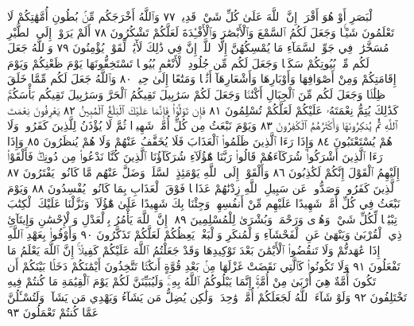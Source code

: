 ٱلْبَصَرِ أَوْ هُوَ أَقْرَبُۚ إِنَّ ٱللَّهَ عَلَىٰ كُلِّ شَيْءࣲ قَدِيرࣱ ٧٧
وَٱللَّهُ أَخْرَجَكُم مِّنۢ بُطُونِ أُمَّهَٰتِكُمْ لَا تَعْلَمُونَ شَيْـࣰٔا
وَجَعَلَ لَكُمُ ٱلسَّمْعَ وَٱلْأَبْصَٰرَ وَٱلْأَفْـِٔدَةَ لَعَلَّكُمْ
تَشْكُرُونَ ٧٨ أَلَمْ يَرَوْا۟ إِلَى ٱلطَّيْرِ مُسَخَّرَٰتࣲ فِي جَوِّ ٱلسَّمَآءِ
مَا يُمْسِكُهُنَّ إِلَّا ٱللَّهُۚ إِنَّ فِي ذَٰلِكَ لَأٓيَٰتࣲ لِّقَوْمࣲ يُؤْمِنُونَ ٧٩
وَٱللَّهُ جَعَلَ لَكُم مِّنۢ بُيُوتِكُمْ سَكَنࣰا وَجَعَلَ لَكُم مِّن جُلُودِ
ٱلْأَنْعَٰمِ بُيُوتࣰا تَسْتَخِفُّونَهَا يَوْمَ ظَعْنِكُمْ وَيَوْمَ إِقَامَتِكُمْ
وَمِنْ أَصْوَافِهَا وَأَوْبَارِهَا وَأَشْعَارِهَآ أَثَٰثࣰا وَمَتَٰعًا إِلَىٰ حِينࣲ ٨٠
وَٱللَّهُ جَعَلَ لَكُم مِّمَّا خَلَقَ ظِلَٰلࣰا وَجَعَلَ لَكُم مِّنَ
ٱلْجِبَالِ أَكْنَٰنࣰا وَجَعَلَ لَكُمْ سَرَٰبِيلَ تَقِيكُمُ
ٱلْحَرَّ وَسَرَٰبِيلَ تَقِيكُم بَأْسَكُمْۚ كَذَٰلِكَ يُتِمُّ نِعْمَتَهُۥ
عَلَيْكُمْ لَعَلَّكُمْ تُسْلِمُونَ ٨١ فَإِن تَوَلَّوْا۟ فَإِنَّمَا عَلَيْكَ
ٱلْبَلَٰغُ ٱلْمُبِينُ ٨٢ يَعْرِفُونَ نِعْمَتَ ٱللَّهِ ثُمَّ يُنكِرُونَهَا
وَأَكْثَرُهُمُ ٱلْكَٰفِرُونَ ٨٣ وَيَوْمَ نَبْعَثُ مِن كُلِّ أُمَّةࣲ
شَهِيدࣰا ثُمَّ لَا يُؤْذَنُ لِلَّذِينَ كَفَرُوا۟ وَلَا هُمْ يُسْتَعْتَبُونَ ٨٤
وَإِذَا رَءَا ٱلَّذِينَ ظَلَمُوا۟ ٱلْعَذَابَ فَلَا يُخَفَّفُ عَنْهُمْ وَلَا هُمْ
يُنظَرُونَ ٨٥ وَإِذَا رَءَا ٱلَّذِينَ أَشْرَكُوا۟ شُرَكَآءَهُمْ قَالُوا۟
رَبَّنَا هَٰٓؤُلَآءِ شُرَكَآؤُنَا ٱلَّذِينَ كُنَّا نَدْعُوا۟ مِن دُونِكَۖ
فَأَلْقَوْا۟ إِلَيْهِمُ ٱلْقَوْلَ إِنَّكُمْ لَكَٰذِبُونَ ٨٦ وَأَلْقَوْا۟ إِلَى
ٱللَّهِ يَوْمَئِذٍ ٱلسَّلَمَۖ وَضَلَّ عَنْهُم مَّا كَانُوا۟ يَفْتَرُونَ ٨٧
ٱلَّذِينَ كَفَرُوا۟ وَصَدُّوا۟ عَن سَبِيلِ ٱللَّهِ زِدْنَٰهُمْ عَذَابࣰا
فَوْقَ ٱلْعَذَابِ بِمَا كَانُوا۟ يُفْسِدُونَ ٨٨ وَيَوْمَ نَبْعَثُ فِي
كُلِّ أُمَّةࣲ شَهِيدًا عَلَيْهِم مِّنْ أَنفُسِهِمْۖ وَجِئْنَا بِكَ
شَهِيدًا عَلَىٰ هَٰٓؤُلَآءِۚ وَنَزَّلْنَا عَلَيْكَ ٱلْكِتَٰبَ تِبْيَٰنࣰا لِّكُلِّ
شَيْءࣲ وَهُدࣰى وَرَحْمَةࣰ وَبُشْرَىٰ لِلْمُسْلِمِينَ ٨٩۞ إِنَّ ٱللَّهَ
يَأْمُرُ بِٱلْعَدْلِ وَٱلْإِحْسَٰنِ وَإِيتَآئِ ذِي ٱلْقُرْبَىٰ وَيَنْهَىٰ عَنِ
ٱلْفَحْشَآءِ وَٱلْمُنكَرِ وَٱلْبَغْيِۚ يَعِظُكُمْ لَعَلَّكُمْ تَذَكَّرُونَ ٩٠
وَأَوْفُوا۟ بِعَهْدِ ٱللَّهِ إِذَا عَٰهَدتُّمْ وَلَا تَنقُضُوا۟ ٱلْأَيْمَٰنَ
بَعْدَ تَوْكِيدِهَا وَقَدْ جَعَلْتُمُ ٱللَّهَ عَلَيْكُمْ كَفِيلًاۚ إِنَّ
ٱللَّهَ يَعْلَمُ مَا تَفْعَلُونَ ٩١ وَلَا تَكُونُوا۟ كَٱلَّتِي نَقَضَتْ
غَزْلَهَا مِنۢ بَعْدِ قُوَّةٍ أَنكَٰثࣰا تَتَّخِذُونَ أَيْمَٰنَكُمْ دَخَلَۢا
بَيْنَكُمْ أَن تَكُونَ أُمَّةٌ هِيَ أَرْبَىٰ مِنْ أُمَّةٍۚ إِنَّمَا يَبْلُوكُمُ ٱللَّهُ
بِهِۦۚ وَلَيُبَيِّنَنَّ لَكُمْ يَوْمَ ٱلْقِيَٰمَةِ مَا كُنتُمْ فِيهِ تَخْتَلِفُونَ ٩٢
وَلَوْ شَآءَ ٱللَّهُ لَجَعَلَكُمْ أُمَّةࣰ وَٰحِدَةࣰ وَلَٰكِن يُضِلُّ مَن
يَشَآءُ وَيَهْدِي مَن يَشَآءُۚ وَلَتُسْـَٔلُنَّ عَمَّا كُنتُمْ تَعْمَلُونَ ٩٣
